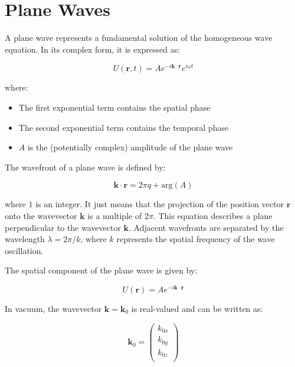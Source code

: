 \documentclass[
  a4paper,
]{book}
\providecommand{\tightlist}{%
  \setlength{\itemsep}{0pt}\setlength{\parskip}{0pt}}
\begin{document}
\section{Plane Waves}\label{plane-waves}

A plane wave represents a fundamental solution of the homogeneous wave
equation. In its complex form, it is expressed as:

\begin{equation}
U(\mathbf{r},t)=Ae^{-i\mathbf{k}\cdot \mathbf{r}}e^{i\omega t}
\end{equation}

where:

\begin{itemize}
\tightlist
\item
  The first exponential term contains the spatial phase
\item
  The second exponential term contains the temporal phase
\item
  \(A\) is the (potentially complex) amplitude of the plane wave
\end{itemize}

The wavefront of a plane wave is defined by:

\[\mathbf{k}\cdot \mathbf{r}=2\pi q + \text{arg}(A)\]

where \(1\) is an integer. It just means that the projection of the
position vector \(\mathbf{r}\) onto the wavevector \(\mathbf{k}\) is a
multiple of \(2\pi\). This equation describes a plane perpendicular to
the wavevector \(\mathbf{k}\). Adjacent wavefronts are separated by the
wavelength \(\lambda=2\pi/k\), where \(k\) represents the spatial
frequency of the wave oscillation.

The spatial component of the plane wave is given by:

\begin{equation}
U(\mathbf{r})=Ae^{-i\mathbf{k}\cdot \mathbf{r}}
\end{equation}

In vacuum, the wavevector \(\mathbf{k}=\mathbf{k}_0\) is real-valued and
can be written as:

\begin{equation}
\mathbf{k}_0=
\begin{pmatrix}
k_{0x} \\
k_{0y}\\
k_{0z}\\
\end{pmatrix}
\end{equation}
\end{document}
